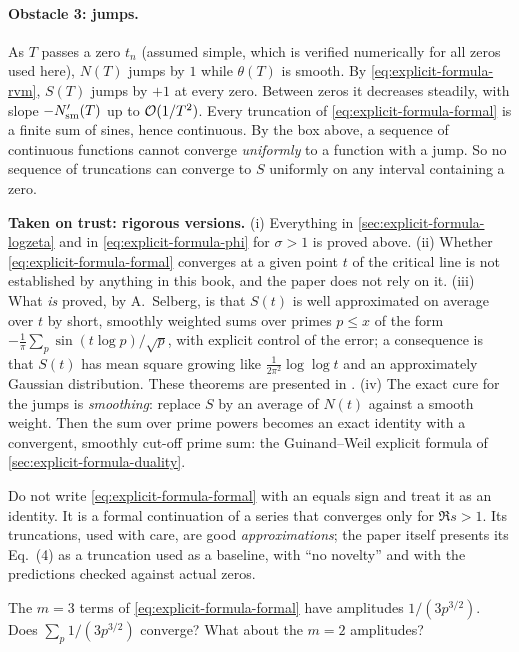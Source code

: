 \paragraph{Obstacle 3: jumps.} As $T$ passes a zero $t_n$ (assumed simple, which is verified numerically for all zeros used here), $N(T)$ jumps by $1$ while $\theta(T)$ is smooth. By \cref{eq:explicit-formula-rvm}, $S(T)$ jumps by $+1$ at every zero. Between zeros it decreases steadily, with slope $-N_{\mathrm{sm}}'(T)$ up to $\mathcal{O}(1/T^2)$. Every truncation of \cref{eq:explicit-formula-formal} is a finite sum of sines, hence continuous. By the box above, a sequence of continuous functions cannot converge \emph{uniformly} to a function with a jump. So no sequence of truncations can converge to $S$ uniformly on any interval containing a zero.

\begin{beyond}
\textbf{Taken on trust: rigorous versions.} (i) Everything in \cref{sec:explicit-formula-logzeta} and in \cref{eq:explicit-formula-phi} for $\sigma>1$ is proved above. (ii) Whether \cref{eq:explicit-formula-formal} converges at a given point $t$ of the critical line is not established by anything in this book, and the paper does not rely on it. (iii) What \emph{is} proved, by A.~Selberg, is that $S(t)$ is well approximated on average over $t$ by short, smoothly weighted sums over primes $p\le x$ of the form $-\frac1\pi\sum_p\sin(t\log p)/\sqrt p$, with explicit control of the error; a consequence is that $S(t)$ has mean square growing like $\frac{1}{2\pi^2}\log\log t$ and an approximately Gaussian distribution. These theorems are presented in \cite{titchmarsh}. (iv) The exact cure for the jumps is \emph{smoothing}: replace $S$ by an average of $N(t)$ against a smooth weight. Then the sum over prime powers becomes an exact identity with a convergent, smoothly cut-off prime sum: the Guinand--Weil explicit formula of \cref{sec:explicit-formula-duality}.
\end{beyond}

\begin{pitfall}
Do not write \cref{eq:explicit-formula-formal} with an equals sign and treat it as an identity. It is a formal continuation of a series that converges only for $\Re s>1$. Its truncations, used with care, are good \emph{approximations}; the paper itself presents its Eq.~(4) as a truncation used as a baseline, with ``no novelty'' and with the predictions checked against actual zeros.
\end{pitfall}

\begin{checkpoint}
The $m=3$ terms of \cref{eq:explicit-formula-formal} have amplitudes $1/(3p^{3/2})$. Does $\sum_p 1/(3p^{3/2})$ converge? What about the $m=2$ amplitudes?
\end{checkpoint}


